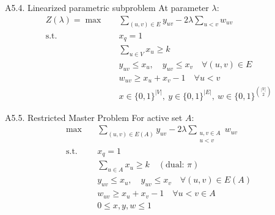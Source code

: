 \documentclass{beamer}
\begin{document}
\begin{frame}{A5.4. Linearized parametric subproblem}
  At parameter $\lambda$:
  \begin{align*}
    Z(\lambda) = \max \quad &
    \sum_{(u,v)\in E} y_{uv} - 2\lambda \sum_{u<v} w_{uv}                                                \\
    \mathrm{s.t.} \quad     &
    x_q = 1                                                                                              \\
                            & \sum_{u\in V} x_u \ge k                                                    \\
                            & y_{uv} \le x_u,\quad y_{uv} \le x_v \quad \forall (u,v) \in E              \\
                            & w_{uv} \ge x_u + x_v - 1 \quad \forall u<v                                 \\
                            & x \in \{0,1\}^{|V|},\ y \in \{0,1\}^{|E|},\ w \in \{0,1\}^{\binom{|V|}{2}}
  \end{align*}
\end{frame}

\begin{frame}{A5.5. Restricted Master Problem}
  For active set $A$:
  \begin{align*}
    \max \quad         &
    \sum_{(u,v)\in E(A)} y_{uv}
    -2\lambda\sum_{\substack{u,v\in A\\u<v}}w_{uv}         \\
    \mathrm{s.t.}\quad &
    x_q = 1                                                \\
                       & \sum_{u\in A}x_u \ge k
    \quad (\text{dual: }\pi)                               \\
                       & y_{uv}\le x_u,\quad y_{uv}\le x_v
    \quad \forall (u,v)\in E(A)                            \\
                       & w_{uv}\ge x_u+x_v-1
    \quad \forall u<v \in A                                \\
                       & 0\le x,y,w\le 1
  \end{align*}
\end{frame}
\end{document}
